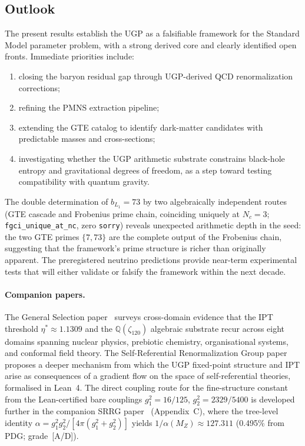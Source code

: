 \documentclass[11pt]{article}
\theoremstyle{remark}
\begin{document}
\subsection{Outlook}

The present results establish the UGP as a falsifiable framework for the Standard Model parameter problem, with a strong derived core and clearly identified open fronts.
Immediate priorities include:
\begin{enumerate}[leftmargin=1.6em,itemsep=0.15em,topsep=0.2em,label=(\roman*)]
  \item closing the baryon residual gap through UGP-derived QCD renormalization corrections;
  \item refining the PMNS extraction pipeline;
  \item extending the GTE catalog to identify dark-matter candidates with predictable masses and cross-sections;
  \item investigating whether the UGP arithmetic substrate constrains black-hole entropy and gravitational degrees of freedom, as a step toward testing compatibility with quantum gravity.
\end{enumerate}
The double determination of $b_{L_1} = 73$ by two algebraically independent routes (GTE cascade and Frobenius prime chain, coinciding uniquely at $N_c = 3$; \texttt{fgci\_unique\_at\_nc}, zero \texttt{sorry}) reveals unexpected arithmetic depth in the seed: the two GTE primes $\{7, 73\}$ are the complete output of the Frobenius chain, suggesting that the framework's prime structure is richer than originally apparent.
The preregistered neutrino predictions provide near-term experimental tests that will either validate or falsify the framework within the next decade.

\paragraph{Companion papers.}
The General Selection paper~\cite{SpivackGeneralSelection} surveys cross-domain
evidence that the IPT threshold $\eta^*\approx 1.1309$ and the
$\mathbb{Q}(\zeta_{120})$ algebraic substrate recur across eight domains spanning
nuclear physics, prebiotic chemistry, organisational systems, and conformal field
theory. The Self-Referential Renormalization Group paper~\cite{SpivackSRRG}
proposes a deeper mechanism from which the UGP fixed-point structure and IPT arise
as consequences of a gradient flow on the space of self-referential theories,
formalised in Lean~4.
The direct coupling route for the fine-structure constant from the Lean-certified
bare couplings $g_1^2 = 16/125$, $g_2^2 = 2329/5400$ is developed further in the
companion SRRG paper~\cite{SpivackSRRG} (Appendix~C), where the tree-level identity
$\alpha = g_1^2 g_2^2/[4\pi(g_1^2+g_2^2)]$ yields $1/\alpha(M_Z) \approx 127.311$
(0.495\% from PDG; grade~[A/D]).
\end{document}
